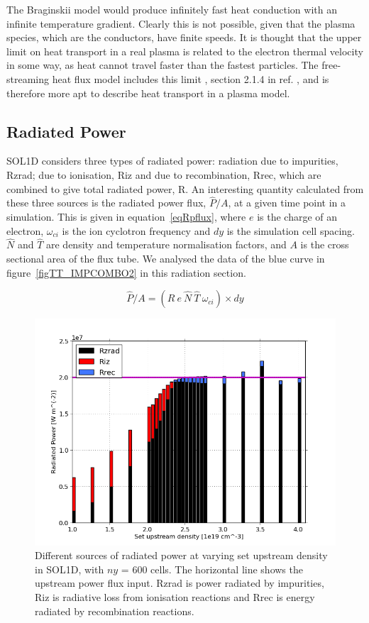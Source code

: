 \documentclass[12pt]{article}  %
\begin{document}
The Braginskii model would produce infinitely fast heat conduction with an infinite temperature gradient. Clearly this is not possible, given that the plasma species, which are the conductors, have finite speeds. It is thought that the upper limit on heat transport in a real plasma is related to the electron thermal velocity in some way, as heat cannot travel faster than the fastest particles. The free-streaming heat flux model includes this limit , section 2.1.4 in ref. \cite{Schneider2006}, and is therefore more apt to describe heat transport in a plasma model.


\subsection{Radiated Power}\label{ssecRpower}
SOL1D considers three types of radiated power: radiation due to impurities, Rzrad; due to ionisation, Riz and due to recombination, Rrec, which are combined to give total radiated power, R. An interesting quantity calculated from these three sources is the radiated power flux, $ \hat{P}/A $, at a given time point in a simulation. This is given in equation~\ref{eqRpflux}, where $e$ is the charge of an electron, $\omega_{ci}$ is the ion cyclotron frequency and $dy$ is the simulation cell spacing. $\hat{N}$ and $\hat{T}$ are density and temperature normalisation factors, and $ A $ is the cross sectional area of the flux tube. We analysed the data of the blue curve in figure~\ref{figTT_IMPCOMBO2} in this radiation section. 

\begin{equation}\label{eqRpflux}
\hat{P}/A = (R~e~\hat{N}~\hat{T}~\omega_{ci}) \times dy
\end{equation}

\begin{figure}
\includegraphics[scale=0.5]{Figures/sol1d/PRbar600ed.png}
\centering
\caption{Different sources of radiated power at varying set upstream density in SOL1D, with $ny$ = 600 cells. The horizontal line shows the upstream power flux input. Rzrad is power radiated by impurities, Riz is radiative loss from ionisation reactions and Rrec is energy radiated by recombination reactions.}\label{figPRbar600}
\end{figure}
\end{document}
